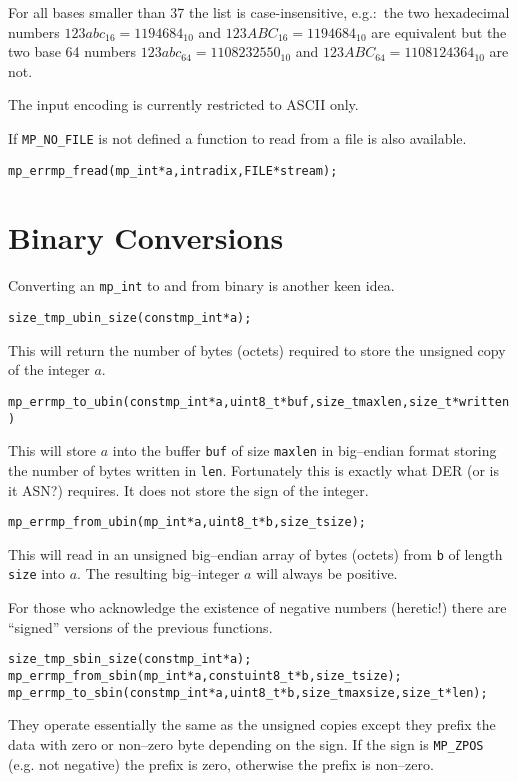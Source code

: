 \documentclass[synpaper]{book}
\begin{document}
For all bases smaller than 37 the list is case-insensitive, e.g.:~the two hexadecimal numbers
$123abc_{16} = 1194684_{10}$ and $123ABC_{16} = 1194684_{10}$ are equivalent but the two base
64 numbers $123abc_{64} = 1108232550_{10}$ and $123ABC_{64} = 1108124364_{10}$ are not.

The input encoding is currently restricted to ASCII only.

If \texttt{MP\_NO\_FILE} is not defined a function to read from a file is also available.

\begin{alltt}
mp_err mp_fread(mp_int *a, int radix, FILE *stream);
\end{alltt}

\section{Binary Conversions}

Converting an \texttt{mp\_int} to and from binary is another keen idea.

\begin{alltt}
size_t mp_ubin_size(const mp_int *a);
\end{alltt}

This will return the number of bytes (octets) required to store the unsigned copy of the integer
$a$.

\begin{alltt}
mp_err mp_to_ubin(const mp_int *a, uint8_t *buf, size_t maxlen, size_t *written)
\end{alltt}
This will store $a$ into the buffer \texttt{buf} of size \texttt{maxlen} in big--endian format
storing the number of bytes written in \texttt{len}.  Fortunately this is exactly what DER (or is
it ASN?) requires.  It does not store the sign of the integer.

\begin{alltt}
mp_err mp_from_ubin(mp_int *a, uint8_t *b, size_t size);
\end{alltt}
This will read in an unsigned big--endian array of bytes (octets) from \texttt{b} of length
\texttt{size} into $a$.  The resulting big--integer $a$ will always be positive.

For those who acknowledge the existence of negative numbers (heretic!) there are ``signed''
versions of the previous functions.

  
\begin{alltt}
size_t mp_sbin_size(const mp_int *a);
mp_err mp_from_sbin(mp_int *a, const uint8_t *b, size_t size);
mp_err mp_to_sbin(const mp_int *a, uint8_t *b, size_t maxsize, size_t *len);
\end{alltt}
They operate essentially the same as the unsigned copies except they prefix the data with zero or
non--zero byte depending on the sign. If the sign is \texttt{MP\_ZPOS} (e.g. not negative) the
prefix is zero, otherwise the prefix is non--zero.
\end{document}
